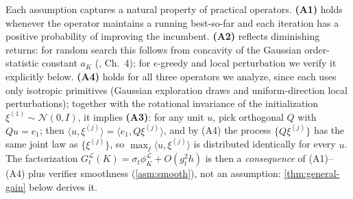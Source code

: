 \begin{remark}
\label{rmk:grounding}
Each assumption captures a natural property of practical operators. \textbf{(A1)} holds whenever the operator maintains a running best-so-far and each iteration has a positive probability of improving the incumbent. \textbf{(A2)} reflects diminishing returns: for random search this follows from concavity of the Gaussian order-statistic constant $a_K$ (\citealt{david2003order}, Ch.~4); for $\epsilon$-greedy and local perturbation we verify it explicitly below. \textbf{(A4)} holds for all three operators we analyze, since each uses only isotropic primitives (Gaussian exploration draws and uniform-direction local perturbations); together with the rotational invariance of the initialization $\xi^{(1)} \sim \mathcal{N}(0, I)$, it implies \textbf{(A3)}: for any unit $u$, pick orthogonal $Q$ with $Qu = e_1$; then $\langle u, \xi^{(j)}\rangle = \langle e_1, Q\xi^{(j)}\rangle$, and by (A4) the process $\{Q\xi^{(j)}\}$ has the same joint law as $\{\xi^{(j)}\}$, so $\max_j \langle u, \xi^{(j)}\rangle$ is distributed identically for every $u$. The factorization $G_t^{\mathcal{L}}(K) = \sigma_t \phi_K^{\mathcal{L}} + O(g_t^2 h)$ is then a \emph{consequence} of (A1)--(A4) plus verifier smoothness (\cref{asm:smooth}), not an assumption: \cref{thm:general-gain} below derives it.
\end{remark}
%
